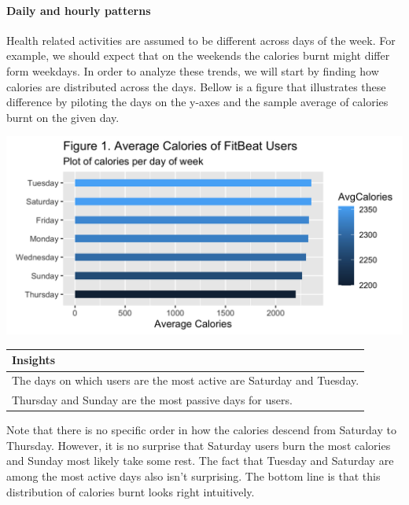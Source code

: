 \documentclass[
]{article}
\begin{document}
\hypertarget{daily-and-hourly-patterns}{%
\paragraph{Daily and hourly patterns}\label{daily-and-hourly-patterns}}

Health related activities are assumed to be different across days of the
week. For example, we should expect that on the weekends the calories
burnt might differ form weekdays. In order to analyze these trends, we
will start by finding how calories are distributed across the days.
Bellow is a figure that illustrates these difference by piloting the
days on the y-axes and the sample average of calories burnt on the given
day.

\begin{center}\includegraphics[width=0.9\linewidth]{./figs/barplot1} \end{center}

\begin{table}
\centering\begingroup\fontsize{14}{16}\selectfont

\begin{tabular}[t]{l}
\hline
Insights\\
\hline
The days on which users are the most active are Saturday and Tuesday.\\
\hline
Thursday and Sunday are the most passive days for users.\\
\hline
\end{tabular}
\endgroup{}
\end{table}

Note that there is no specific order in how the calories descend from
Saturday to Thursday. However, it is no surprise that Saturday users
burn the most calories and Sunday most likely take some rest. The fact
that Tuesday and Saturday are among the most active days also isn't
surprising. The bottom line is that this distribution of calories burnt
looks right intuitively.
\end{document}
